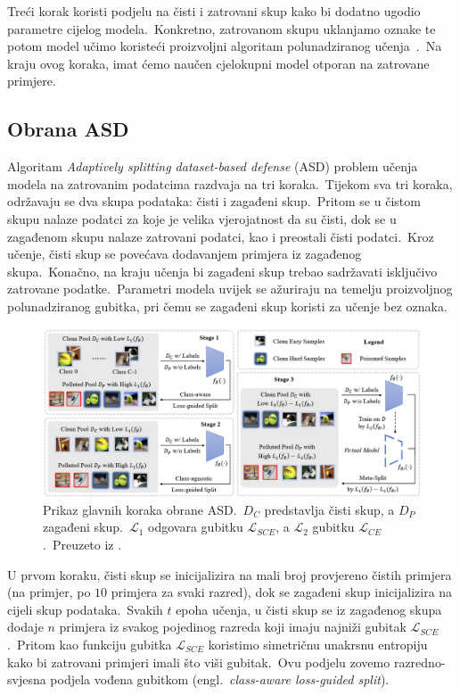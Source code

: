 \documentclass[diplomskirad]{fer}
\begin{document}
Treći korak koristi podjelu na čisti i zatrovani skup kako bi dodatno ugodio parametre cijelog modela.\ 
Konkretno, zatrovanom skupu uklanjamo oznake te potom model učimo koristeći proizvoljni algoritam polunadziranog učenja~\cite{van2020survey}.\ 
Na kraju ovog koraka, imat ćemo naučen cjelokupni model otporan na zatrovane primjere.\ 

\pagebreak

\subsection{Obrana ASD}
\label{sub:asd}

Algoritam \textit{Adaptively splitting dataset-based defense} (ASD) problem učenja modela na zatrovanim podatcima razdvaja na tri koraka.\ 
Tijekom sva tri koraka, održavaju se dva skupa podataka: čisti i zagađeni skup.\ Pritom se u čistom skupu nalaze podatci za koje je velika vjerojatnost da su čisti, dok se u zagađenom skupu nalaze zatrovani podatci, kao i preostali čisti podatci.\ 
Kroz učenje, čisti skup se povećava dodavanjem primjera iz zagađenog skupa.\ Konačno, na kraju učenja bi zagađeni skup trebao sadržavati isključivo zatrovane podatke.\ 
Parametri modela uvijek se ažuriraju na temelju proizvoljnog polunadziranog gubitka, pri čemu se zagađeni skup koristi za učenje bez oznaka.\   

\begin{figure}[h]
  \centering
  \includegraphics[scale=0.65]{./Slike/asd.png}
  \caption{Prikaz glavnih koraka obrane ASD.\ $D_C$ predstavlja čisti skup, a $D_P$ zagađeni skup.\ $\mathcal{L}_1$ odgovara gubitku $\mathcal{L}_{SCE}$, a $\mathcal{L}_2$ gubitku $\mathcal{L}_{CE}$.\ Preuzeto iz \cite{gao2023backdoor}.}
  \label{fig:asd}
\end{figure}
  
U prvom koraku, čisti skup se inicijalizira na mali broj provjereno čistih primjera (na primjer, po $10$ primjera za svaki razred), dok se zagađeni skup inicijalizira na cijeli skup podataka.\ 
Svakih $t$ epoha učenja, u čisti skup se iz zagađenog skupa dodaje $n$ primjera iz svakog pojedinog razreda koji imaju najniži gubitak $\mathcal{L}_{SCE}$.\ Pritom kao funkciju gubitka $\mathcal{L}_{SCE}$ koristimo simetričnu unakrsnu entropiju kako bi zatrovani primjeri imali što viši gubitak.\ 
Ovu podjelu zovemo razredno-svjesna podjela vođena gubitkom (engl.\ \textit{class-aware loss-guided split}).\ 
  
\end{document}
